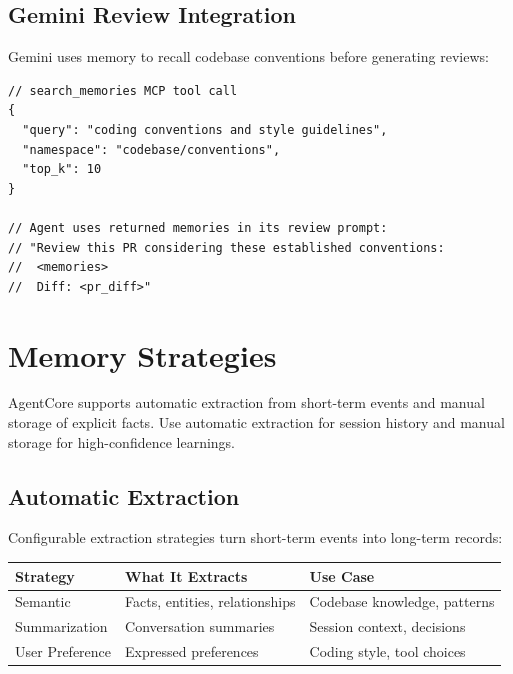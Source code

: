 \documentclass[11pt,letterpaper]{article}
\renewcommand{\arraystretch}{1.4}
\begin{document}
\subsection{Gemini Review Integration}

Gemini uses memory to recall codebase conventions before generating reviews:

\begin{lstlisting}[caption={Pre-populating review context from memory}, language={}]
// search_memories MCP tool call
{
  "query": "coding conventions and style guidelines",
  "namespace": "codebase/conventions",
  "top_k": 10
}

// Agent uses returned memories in its review prompt:
// "Review this PR considering these established conventions:
//  <memories>
//  Diff: <pr_diff>"
\end{lstlisting}

\section{Memory Strategies}

\begin{tldrbox}
AgentCore supports automatic extraction from short-term events and manual storage of explicit facts. Use automatic extraction for session history and manual storage for high-confidence learnings.
\end{tldrbox}

\subsection{Automatic Extraction}

Configurable extraction strategies turn short-term events into long-term records:

\begin{center}
\renewcommand{\arraystretch}{1.5}
\begin{tabular}{L{3cm} L{5cm} L{5cm}}
\textbf{\color{infoteal}Strategy} & \textbf{\color{infoteal}What It Extracts} & \textbf{\color{infoteal}Use Case} \\
\midrule
{}
Semantic & Facts, entities, relationships & Codebase knowledge, patterns \\
Summarization & Conversation summaries & Session context, decisions \\
User Preference & Expressed preferences & Coding style, tool choices \\
\bottomrule
\end{tabular}
\end{center}
\end{document}
